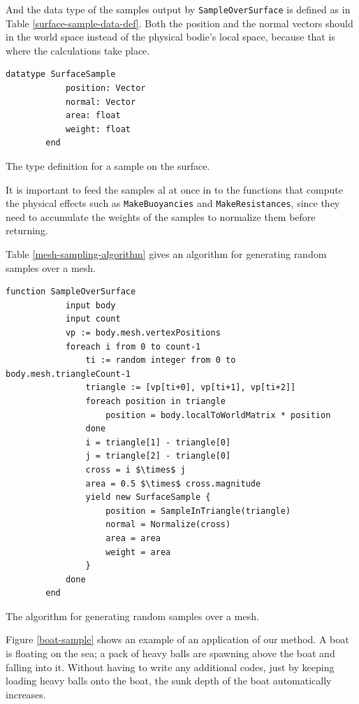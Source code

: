 And the data type of the samples output by \texttt{SampleOverSurface} is defined as in Table \ref{surface-sample-data-def}.
Both the position and the normal vectors should in the world space instead of the physical bodie's local space, because that is where the calculations take place.

\begin{table}[htb]
	\centering
	\begin{lstlisting}[style=pseudo]
		datatype SurfaceSample
			position: Vector
			normal: Vector
			area: float
			weight: float
		end
	\end{lstlisting}
	\caption{The type definition for a sample on the surface.}
	\label{surface-sample-data-def}
\end{table}

It is important to feed the samples al at once in to the functions that compute the physical effects such as \texttt{MakeBuoyancies} and \texttt{MakeResistances}, since they need to accumulate the weights of the samples to normalize them before returning.

Table \ref{mesh-sampling-algorithm} gives an algorithm for generating random samples over a mesh.

\begin{table}[htb]
	\centering
	\begin{lstlisting}[style=pseudo]
		function SampleOverSurface
			input body
			input count
			vp := body.mesh.vertexPositions
			foreach i from 0 to count-1
				ti := random integer from 0 to body.mesh.triangleCount-1
				triangle := [vp[ti+0], vp[ti+1], vp[ti+2]]
				foreach position in triangle
					position = body.localToWorldMatrix * position
				done
				i = triangle[1] - triangle[0]
				j = triangle[2] - triangle[0]
				cross = i $\times$ j
				area = 0.5 $\times$ cross.magnitude
				yield new SurfaceSample {
					position = SampleInTriangle(triangle)
					normal = Normalize(cross)
					area = area
					weight = area
				}
			done
		end
	\end{lstlisting}
	\caption{The algorithm for generating random samples over a mesh.}
	\label{mesh-sampling-algorithm}
\end{table}

Figure \ref{boat-sample} shows an example of an application of our method.
A boat is floating on the sea; a pack of heavy balls are spawning above the boat and falling into it.
Without having to write any additional codes, just by keeping loading heavy balls onto the boat, the sunk depth of the boat automatically increases.

